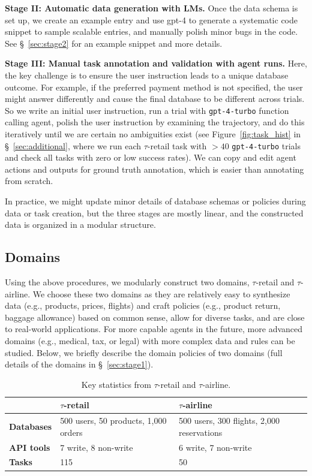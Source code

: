 \documentclass{article}
\newcommand{\retail}{$\tau$-retail}  %
\newcommand{\airline}{$\tau$-airline}
\begin{document}
\textbf{Stage II: Automatic data generation with LMs.} Once the data schema is set up, we create an example entry and use gpt-4 to generate a systematic code snippet to sample scalable entries, and manually polish minor bugs in the code. See \S~\ref{sec:stage2} for an example snippet and more details.

\textbf{Stage III: Manual task annotation and validation with agent runs.}
Here, the key challenge is to ensure the user instruction leads to a unique database outcome. For example, if the preferred payment method is not specified, the user might answer differently and cause the final database to be different across trials. So we write an initial user instruction, run a trial with \texttt{gpt-4-turbo} function calling agent, polish the user instruction by examining the trajectory, and do this iteratively until we are certain no ambiguities exist (see Figure~\ref{fig:task_hist} in \S~\ref{sec:additional}, where we run each \retail{} task with $>40$ \texttt{gpt-4-turbo} trials and check all tasks with zero or low success rates). We can copy and edit agent actions and outputs for ground truth annotation, which is easier than annotating from scratch. 



In practice, we might update minor details of database schemas or policies during data or task creation, but the three stages are mostly linear, and the constructed data is organized in a modular structure.  

\subsection{Domains}
Using the above procedures, we modularly construct two domains, \retail{} and \airline{}. 
We choose these two domains as they are relatively easy to synthesize data (e.g., products, prices, flights) and craft policies (e.g., product return, baggage allowance) based on common sense, allow for diverse tasks, and are close to real-world applications. For more capable agents in the future, more advanced domains (e.g., medical, tax, or legal) with more complex data and rules can be studied. Below, we briefly describe the domain policies of two domains (full details of the domains in \S~\ref{sec:stage1}). 
\begin{table}[t]

\centering
\begin{tabular}{lll}
\toprule
 & \textbf{\retail{}} & \textbf{\airline{}} \\
\midrule 
\textbf{Databases} & 500 users, 50 products, 1,000 orders & 500 users, 300 flights, 2,000 reservations \\
\textbf{API tools} & 7 write, 8 non-write & 6 write, 7 non-write \\
\textbf{Tasks} & 115 & 50 \\
\bottomrule
\end{tabular}
\vspace{10pt}
\caption{Key statistics from \retail{} and \airline{}.}
\label{tab:domains}
\vspace{-15pt}
\end{table}
\end{document}
